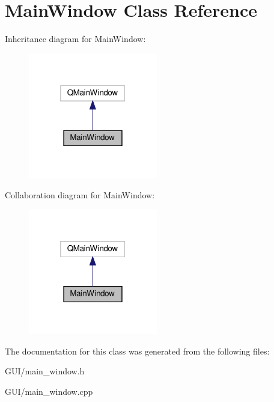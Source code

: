 \hypertarget{classMainWindow}{}\section{Main\+Window Class Reference}
\label{classMainWindow}


Inheritance diagram for Main\+Window\+:\nopagebreak
\begin{figure}[H]
\begin{center}
\leavevmode
\includegraphics[width=160pt]{classMainWindow__inherit__graph}
\end{center}
\end{figure}


Collaboration diagram for Main\+Window\+:\nopagebreak
\begin{figure}[H]
\begin{center}
\leavevmode
\includegraphics[width=160pt]{classMainWindow__coll__graph}
\end{center}
\end{figure}


The documentation for this class was generated from the following files\+:\begin{DoxyCompactItemize}
\item 
G\+U\+I/main\+\_\+window.\+h\item 
G\+U\+I/main\+\_\+window.\+cpp\end{DoxyCompactItemize}
